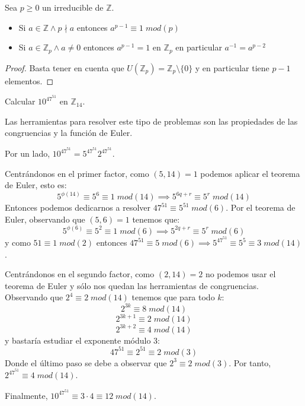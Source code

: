 \begin{corollary}
	Sea $p \ge 0$ un irreducible de $\mathbb{Z}$.
	
	\begin{itemize}
		\item Si $a \in \mathbb{Z} \land p \nmid a$ entonces $a^{p-1} \equiv 1 \; mod(p)$ 
		\item Si $a \in \mathbb{Z}_p \land a \neq 0$ entonces $a^{p-1} = 1$ en $\mathbb{Z}_p$ en particular $a^{-1} = a^{p-2}$
	\end{itemize}
\end{corollary}
\begin{proof}
Basta tener en cuenta que $U(\mathbb{Z}_p) = \mathbb{Z}_p \setminus \{0\}$ y en particular tiene $p-1$ elementos. 
\end{proof}

\begin{example}
	Calcular $10^{47^{51}}$ en $\mathbb{Z}_{14}$. 
	
	Las herramientas para resolver este tipo de problemas son las propiedades de las congruencias y la función de Euler. 
	
	Por un lado, $10^{47^{51}} = 5^{47^{51}} 2^{47^{51}}$. 
	
	Centrándonos en el primer factor, como $(5,14) = 1$ podemos aplicar el teorema de Euler, esto es: $$5^{\phi(14)} \equiv 5^6 \equiv 1 \; mod(14) \implies 5^{6q+r} \equiv 5^r \; mod(14)$$ Entonces podemos dedicarnos a resolver $47^{51} \equiv 5^{51} \; mod(6)$. Por el teorema de Euler, observando que $(5,6) = 1$ tenemos que: $$5^{\phi(6)} \equiv 5^2 \equiv 1 \; mod(6) \implies 5^{2q+r} \equiv 5^r \; mod(6)$$  y como $51 \equiv 1 \; mod(2)$ entonces $47^{51} \equiv 5 \; mod(6) \implies 5^{47^{51}} \equiv 5^5 \equiv 3 \; mod(14)$.
	
	Centrándonos en el segundo factor, como $(2,14) = 2$ no podemos usar el teorema de Euler y sólo nos quedan las herramientas de congruencias. Observando que $2^4 \equiv 2 \; mod(14)$ tenemos que para todo $k$: $$2^{3k} \equiv 8 \; mod(14)$$ $$2^{3k+1} \equiv 2 \; mod(14)$$ $$2^{3k+2} \equiv 4 \; mod(14)$$ y bastaría estudiar el exponente módulo 3: $$47^{51} \equiv 2^{51}  \equiv 2 \; mod(3)$$ Donde el último paso se debe a observar que $2^3 \equiv 2 \; mod(3)$. Por tanto, $2^{47^{51}} \equiv 4 \; mod(14)$. 
	
	Finalmente, $10^{47^{51}} \equiv 3 \cdot 4 \equiv 12 \; mod(14)$.
\end{example}

